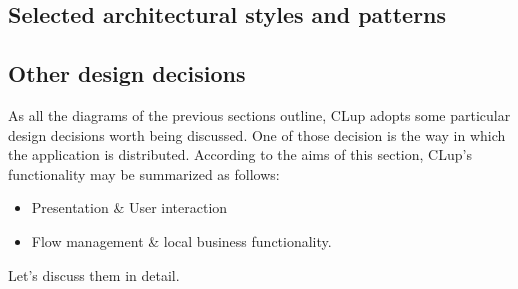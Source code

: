 \subsection{Selected architectural styles and patterns}
\subsection{Other design decisions}
As all the diagrams of the previous sections outline, CLup adopts some particular design decisions worth being discussed. \newline
One of those decision is the way in which the application is distributed. According to the aims of this section, CLup's functionality may be summarized as follows:
\begin{itemize}
    \item Presentation \& User interaction
    \item Flow management \& local business functionality.
\end{itemize}
Let's discuss them in detail.
